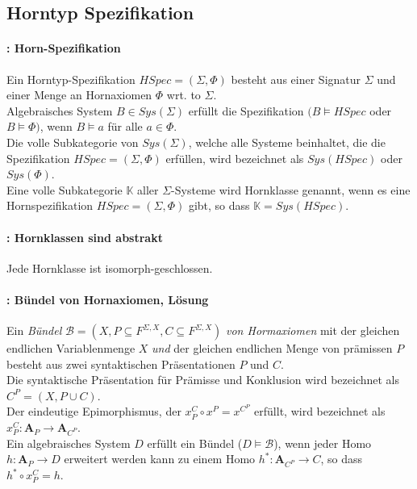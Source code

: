 \subsection{Horntyp Spezifikation}

\paragraph{: Horn-Spezifikation}
Ein Horntyp-Spezifikation $HSpec = (\Sigma, \Phi)$ besteht aus einer Signatur $\Sigma$ und einer Menge an Hornaxiomen $\Phi$ wrt. to $\Sigma$. \\
Algebraisches System $B \in Sys(\Sigma)$ erfüllt die Spezifikation $(B \models HSpec$  oder $B \models \Phi)$, wenn $B \models a$ für alle $a \in \Phi$.  \\
Die volle Subkategorie von $Sys(\Sigma)$, welche alle Systeme beinhaltet, die die Spezifikation $HSpec = (\Sigma, \Phi)$ 
erfüllen, wird bezeichnet als $Sys(HSpec)$ oder $Sys(\Phi)$. \\
Eine volle Subkategorie $\mathbb{K}$ aller $\Sigma$-Systeme wird Hornklasse genannt, wenn es eine Hornspezifikation $HSpec = (\Sigma, \Phi)$ gibt, so dass $\mathbb{K} = Sys(HSpec)$.

\paragraph{: Hornklassen sind abstrakt}
Jede Hornklasse ist isomorph-geschlossen.

\paragraph{: Bündel von Hornaxiomen, Lösung}
Ein \emph{Bündel }$\mathcal{B}=\left(X,P\subseteq F^{\Sigma,X},C\subseteq F^{\Sigma,X}\right)$\emph{
von Hormaxiomen} mit der gleichen endlichen Variablenmenge  $X$ \emph{und}
der gleichen endlichen Menge  von prämissen $P$ besteht aus zwei syntaktischen Präsentationen
$P$ und $C$. \\
Die syntaktische Präsentation für Prämisse und Konklusion wird bezeichnet als $C^{P}=(X,P\cup C)$. \\
Der eindeutige Epimorphismus, der $x_{P}^{C}\circ x^{P}=x^{C^{P}}$ erfüllt, wird bezeichnet als  $x_{P}^{C}:\mathbf{A}_{P}\rightarrow\mathbf{A}_{C^{P}}$. \\
Ein algebraisches System $D$ erfüllt ein Bündel  ($D\models\mathcal{B}$),
wenn jeder Homo $h:\mathbf{A}_{P}\rightarrow D$ erweitert werden kann
zu einem Homo $h^{*}:\mathbf{A}_{C^{P}}\rightarrow C$, so dass
$h^{*}\circ x_{P}^{C}=h$.

